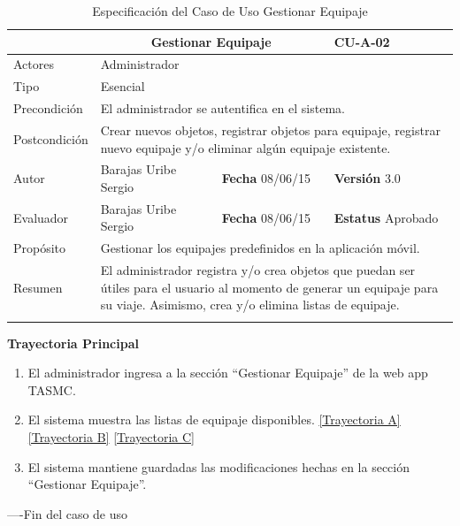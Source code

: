 \begin{longtable}{|p{2.5cm}|p{6.4cm}|p{2cm}|p{2cm}|}
	\hline
		\rowcolor[RGB]{51,153,255}{Caso de Uso}&\multicolumn{2}{c}{Gestionar Equipaje}&{\textbf{CU-A-02}}\\
	\hline
		{Actores}&\multicolumn{3}{p{11.2cm}|}{Administrador}\\
	\hline
		{Tipo}&\multicolumn{3}{p{11.2cm}|}{Esencial}\\
	\hline
		{Precondición}&\multicolumn{3}{p{11.2cm}|}{El administrador se autentifica en el sistema.}\\
	\hline
		{Postcondición}&\multicolumn{3}{p{11.2cm}|}{Crear nuevos objetos, registrar objetos para equipaje, registrar nuevo equipaje y/o eliminar algún equipaje existente.}\\
	\hline
		{Autor}&{Barajas Uribe Sergio}&{\textbf{Fecha} 08/06/15}&{\textbf{Versión} 3.0}\\
			\hline
		{Evaluador}&{Barajas Uribe Sergio}&{\textbf{Fecha} 08/06/15}&{\textbf{Estatus} Aprobado}\\
	\hline
		{Propósito}&\multicolumn{3}{p{11.2cm}|}{Gestionar los equipajes predefinidos en la aplicación móvil.}\\
	\hline
		{Resumen}&\multicolumn{3}{p{11.2cm}|}{El administrador registra y/o crea objetos que puedan ser útiles para el usuario al momento de generar un equipaje para su viaje. Asimismo, crea y/o elimina listas de equipaje. }\\	
	\hline
	\caption[Especificación del Caso de Uso Gestionar Equipaje]{Especificación del Caso de Uso Gestionar Equipaje}
    	\label{tab:cuGestionarEquipaje}
\end{longtable}

\begin{flushleft}
	\textbf{Trayectoria Principal}\\
	\begin{enumerate}
		\item El administrador ingresa a la sección ``Gestionar Equipaje'' de la web app TASMC.
		\item El sistema muestra las listas de equipaje disponibles. \hyperlink{TrayectoriaA_CU-A-02}{[Trayectoria A]} \hyperlink{TrayectoriaB_CU-A-02}{[Trayectoria B]} \hyperlink{TrayectoriaC_CU-A-02}{[Trayectoria C]}
		\item El sistema mantiene guardadas las modificaciones hechas en la sección ``Gestionar Equipaje''.
	\end{enumerate}
\end{flushleft}
----Fin del caso de uso


